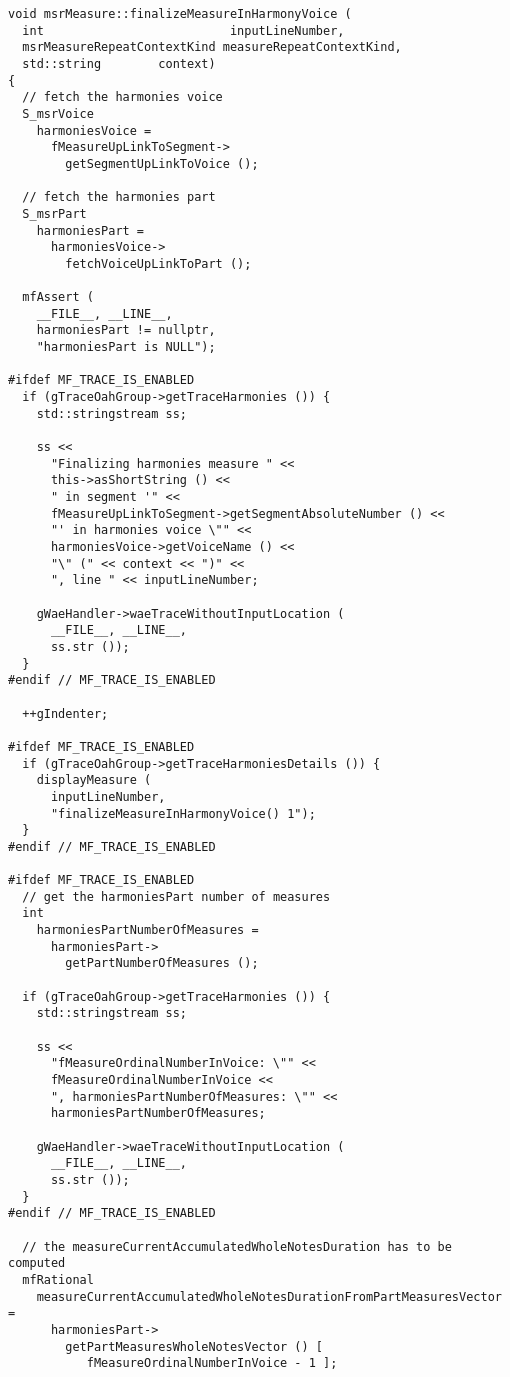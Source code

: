 \begin{lstlisting}[language=CPlusPlus]
void msrMeasure::finalizeMeasureInHarmonyVoice (
  int                          inputLineNumber,
  msrMeasureRepeatContextKind measureRepeatContextKind,
  std::string        context)
{
  // fetch the harmonies voice
  S_msrVoice
    harmoniesVoice =
      fMeasureUpLinkToSegment->
        getSegmentUpLinkToVoice ();

  // fetch the harmonies part
  S_msrPart
    harmoniesPart =
      harmoniesVoice->
        fetchVoiceUpLinkToPart ();

  mfAssert (
    __FILE__, __LINE__,
    harmoniesPart != nullptr,
    "harmoniesPart is NULL");

#ifdef MF_TRACE_IS_ENABLED
  if (gTraceOahGroup->getTraceHarmonies ()) {
    std::stringstream ss;

    ss <<
      "Finalizing harmonies measure " <<
      this->asShortString () <<
      " in segment '" <<
      fMeasureUpLinkToSegment->getSegmentAbsoluteNumber () <<
      "' in harmonies voice \"" <<
      harmoniesVoice->getVoiceName () <<
      "\" (" << context << ")" <<
      ", line " << inputLineNumber;

    gWaeHandler->waeTraceWithoutInputLocation (
      __FILE__, __LINE__,
      ss.str ());
  }
#endif // MF_TRACE_IS_ENABLED

  ++gIndenter;

#ifdef MF_TRACE_IS_ENABLED
  if (gTraceOahGroup->getTraceHarmoniesDetails ()) {
    displayMeasure (
      inputLineNumber,
      "finalizeMeasureInHarmonyVoice() 1");
  }
#endif // MF_TRACE_IS_ENABLED

#ifdef MF_TRACE_IS_ENABLED
  // get the harmoniesPart number of measures
  int
    harmoniesPartNumberOfMeasures =
      harmoniesPart->
        getPartNumberOfMeasures ();

  if (gTraceOahGroup->getTraceHarmonies ()) {
    std::stringstream ss;

    ss <<
      "fMeasureOrdinalNumberInVoice: \"" <<
      fMeasureOrdinalNumberInVoice <<
      ", harmoniesPartNumberOfMeasures: \"" <<
      harmoniesPartNumberOfMeasures;

    gWaeHandler->waeTraceWithoutInputLocation (
      __FILE__, __LINE__,
      ss.str ());
  }
#endif // MF_TRACE_IS_ENABLED

  // the measureCurrentAccumulatedWholeNotesDuration has to be computed
  mfRational
    measureCurrentAccumulatedWholeNotesDurationFromPartMeasuresVector =
      harmoniesPart->
        getPartMeasuresWholeNotesVector () [
           fMeasureOrdinalNumberInVoice - 1 ];


\end{lstlisting}
